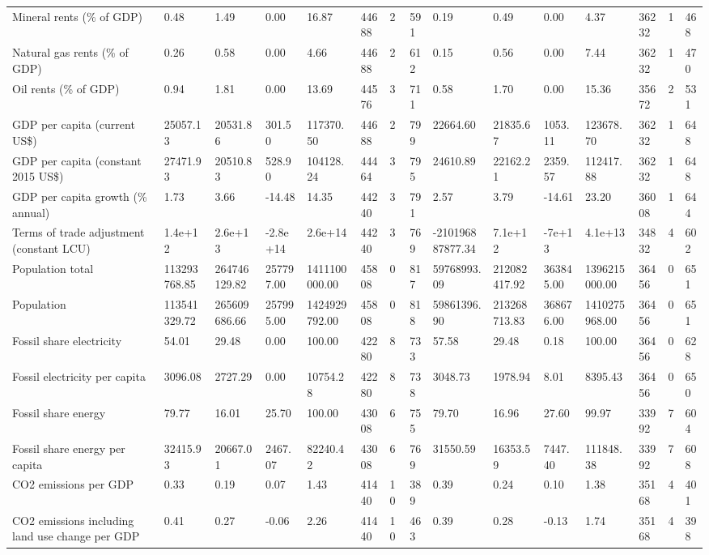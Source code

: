 \begin{longtable}{lllllllllllllll}
\addlinespace
Mineral rents (\% of GDP) & 0.48 & 1.49 & 0.00 & 16.87 & 44688 & 2 & 591 & 0.19 & 0.49 & 0.00 & 4.37 & 36232 & 1 & 468\\
Natural gas rents (\% of GDP) & 0.26 & 0.58 & 0.00 & 4.66 & 44688 & 2 & 612 & 0.15 & 0.56 & 0.00 & 7.44 & 36232 & 1 & 470\\
Oil rents (\% of GDP) & 0.94 & 1.81 & 0.00 & 13.69 & 44576 & 3 & 711 & 0.58 & 1.70 & 0.00 & 15.36 & 35672 & 2 & 531\\
GDP per capita (current US\$) & 25057.13 & 20531.86 & 301.50 & 117370.50 & 44688 & 2 & 799 & 22664.60 & 21835.67 & 1053.11 & 123678.70 & 36232 & 1 & 648\\
GDP per capita (constant 2015 US\$) & 27471.93 & 20510.83 & 528.90 & 104128.24 & 44464 & 3 & 795 & 24610.89 & 22162.21 & 2359.57 & 112417.88 & 36232 & 1 & 648\\
\addlinespace
GDP per capita growth (\% annual) & 1.73 & 3.66 & -14.48 & 14.35 & 44240 & 3 & 791 & 2.57 & 3.79 & -14.61 & 23.20 & 36008 & 1 & 644\\
Terms of trade adjustment (constant LCU) & 1.4e+12 & 2.6e+13 & -2.8e+14 & 2.6e+14 & 44240 & 3 & 769 & -210196887877.34 & 7.1e+12 & -7e+13 & 4.1e+13 & 34832 & 4 & 602\\
Population total & 113293768.85 & 264746129.82 & 257797.00 & 1411100000.00 & 45808 & 0 & 817 & 59768993.09 & 212082417.92 & 363845.00 & 1396215000.00 & 36456 & 0 & 651\\
Population & 113541329.72 & 265609686.66 & 257995.00 & 1424929792.00 & 45808 & 0 & 818 & 59861396.90 & 213268713.83 & 368676.00 & 1410275968.00 & 36456 & 0 & 651\\
Fossil share electricity & 54.01 & 29.48 & 0.00 & 100.00 & 42280 & 8 & 733 & 57.58 & 29.48 & 0.18 & 100.00 & 36456 & 0 & 628\\
\addlinespace
Fossil electricity per capita & 3096.08 & 2727.29 & 0.00 & 10754.28 & 42280 & 8 & 738 & 3048.73 & 1978.94 & 8.01 & 8395.43 & 36456 & 0 & 650\\
Fossil share energy & 79.77 & 16.01 & 25.70 & 100.00 & 43008 & 6 & 755 & 79.70 & 16.96 & 27.60 & 99.97 & 33992 & 7 & 604\\
Fossil share energy per capita & 32415.93 & 20667.01 & 2467.07 & 82240.42 & 43008 & 6 & 769 & 31550.59 & 16353.59 & 7447.40 & 111848.38 & 33992 & 7 & 608\\
CO2 emissions per GDP & 0.33 & 0.19 & 0.07 & 1.43 & 41440 & 10 & 389 & 0.39 & 0.24 & 0.10 & 1.38 & 35168 & 4 & 401\\
CO2 emissions including land use change per GDP & 0.41 & 0.27 & -0.06 & 2.26 & 41440 & 10 & 463 & 0.39 & 0.28 & -0.13 & 1.74 & 35168 & 4 & 398\\

\end{longtable}
